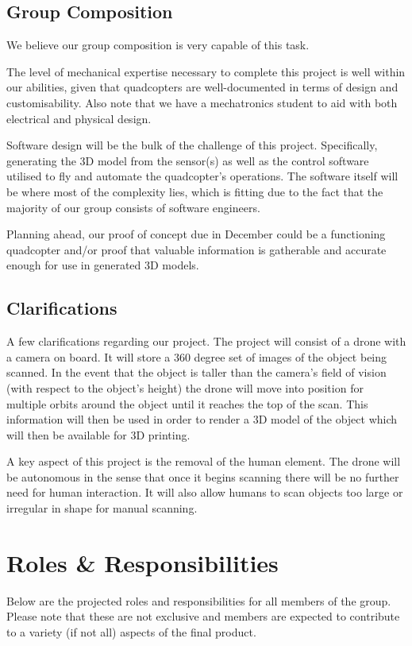 \documentclass[10pt,letterpaper]{article}
\begin{document}
\subsection{Group Composition}
We believe our group composition is very capable of this task. \par 
The level of mechanical expertise necessary to complete this project is well within our abilities, given that quadcopters are well-documented in terms of design and customisability. Also note that we have a mechatronics student to aid with both electrical and physical design. \par 
Software design will be the bulk of the challenge of this project. Specifically, generating the 3D model from the sensor(s) as well as the control software utilised to fly and automate the quadcopter's operations. The software itself will be where most of the complexity lies, which is fitting due to the fact that the majority of our group consists of software engineers. \par 
Planning ahead, our proof of concept due in December could be a functioning quadcopter and/or proof that valuable information is gatherable and accurate enough for use in generated 3D models.

\subsection{Clarifications}
A few clarifications regarding our project. The project will consist of a drone with a camera on board. It will store a 360 degree set of images of the object being scanned. In the event that the object is taller than the camera's field of vision (with respect to the object's height) the drone will move into position for multiple orbits around the object until it reaches the top of the scan. This information will then be used in order to render a 3D model of the object which will then be available for 3D printing. \par 
A key aspect of this project is the removal of the human element. The drone will be autonomous in the sense that once it begins scanning there will be no further need for human interaction. It will also allow humans to scan objects too large or irregular in shape for manual scanning.


\newpage

\section{Roles \& Responsibilities}
Below are the projected roles and responsibilities for all members of the group. Please note that these are not exclusive and members are expected to contribute to a variety (if not all) aspects of the final product. 
\end{document}
